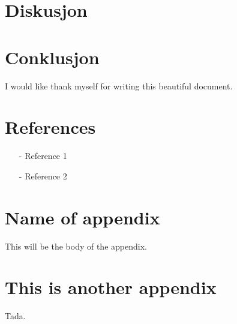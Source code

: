\documentclass[reprint,english,notitlepage]{revtex4-2}  %
\begin{document}
\section{Diskusjon}
\section{Conklusjon}
\begin{acknowledgments}  %
I would like thank myself for writing this beautiful document.
\end{acknowledgments}


\section*{References}  %
\begin{itemize}
\item[-]Reference 1
\item[-]Reference 2
\end{itemize}

\newpage
\appendix
\section{Name of appendix}
This will be the body of the appendix.
\section{This is another appendix}\label{appendix}
Tada.

\end{document}

